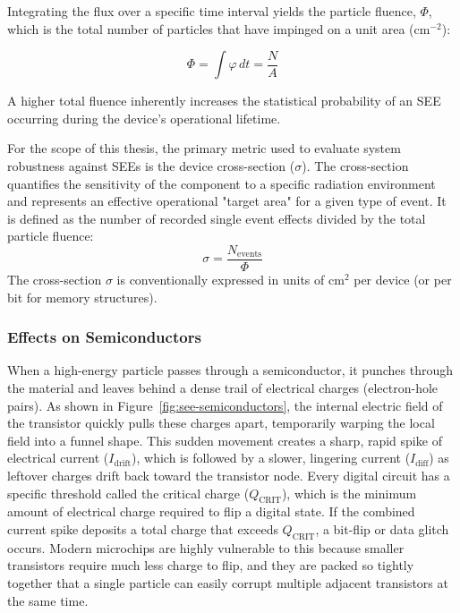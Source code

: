 Integrating the flux over a specific time interval yields the particle fluence, $\Phi$, which is the total number of particles that have impinged on a unit area ($\text{cm}^{-2}$):

\begin{equation}
    \Phi = \int \varphi \, dt = \frac{N}{A}
\end{equation}

A higher total fluence inherently increases the statistical probability of an SEE occurring during the device's operational lifetime.

For the scope of this thesis, the primary metric used to evaluate system robustness against SEEs is the device cross-section ($\sigma$). The cross-section quantifies the sensitivity of the component to a specific radiation environment and represents an effective operational "target area" for a given type of event. It is defined as the number of recorded single event effects divided by the total particle fluence:
\begin{equation}
    \sigma = \frac{N_{\text{events}}}{\Phi}
\end{equation}
The cross-section $\sigma$ is conventionally expressed in units of $\text{cm}^2$ per device (or per bit for memory structures).

\subsubsection*{Effects on Semiconductors}

When a high-energy particle passes through a semiconductor, it punches through the material and leaves behind a dense trail of electrical charges (electron-hole pairs). As shown in Figure~\ref{fig:see-semiconductors}, the internal electric field of the transistor quickly pulls these charges apart, temporarily warping the local field into a funnel shape. This sudden movement creates a sharp, rapid spike of electrical current ($I_{\text{drift}}$), which is followed by a slower, lingering current ($I_{\text{diff}}$) as leftover charges drift back toward the transistor node. Every digital circuit has a specific threshold called the critical charge ($Q_{\text{CRIT}}$), which is the minimum amount of electrical charge required to flip a digital state. If the combined current spike deposits a total charge that exceeds $Q_{\text{CRIT}}$, a bit-flip or data glitch occurs. Modern microchips are highly vulnerable to this because smaller transistors require much less charge to flip, and they are packed so tightly together that a single particle can easily corrupt multiple adjacent transistors at the same time.

